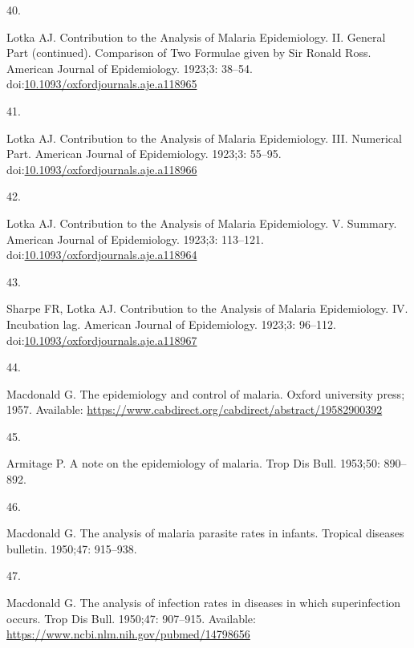 \documentclass[
]{book}
\newlength{\cslhangindent}
\newlength{\csllabelwidth}
\newlength{\cslentryspacingunit} %
\newenvironment{CSLReferences}[2] %
 {%
  \setlength{\parindent}{0pt}
  \ifodd #1
  \let\oldpar\par
  \def\par{\hangindent=\cslhangindent\oldpar}
  \fi
  \setlength{\parskip}{#2\cslentryspacingunit}
 }%
 {}
\newcommand{\CSLLeftMargin}[1]{\parbox[t]{\csllabelwidth}{#1}}
\newcommand{\CSLRightInline}[1]{\parbox[t]{\linewidth - \csllabelwidth}{#1}\break}
\begin{document}
\begin{CSLReferences}{0}{0}
\leavevmode{}%
\CSLLeftMargin{40. }%
\CSLRightInline{Lotka AJ. Contribution to the {Analysis} of {Malaria} {Epidemiology}. {II}. {General} {Part} (continued). {Comparison} of {Two} {Formulae} given by {Sir} {Ronald} {Ross}. American Journal of Epidemiology. 1923;3: 38--54. doi:\href{https://doi.org/10.1093/oxfordjournals.aje.a118965}{10.1093/oxfordjournals.aje.a118965}}

\leavevmode{}%
\CSLLeftMargin{41. }%
\CSLRightInline{Lotka AJ. Contribution to the {Analysis} of {Malaria} {Epidemiology}. {III}. {Numerical} {Part}. American Journal of Epidemiology. 1923;3: 55--95. doi:\href{https://doi.org/10.1093/oxfordjournals.aje.a118966}{10.1093/oxfordjournals.aje.a118966}}

\leavevmode{}%
\CSLLeftMargin{42. }%
\CSLRightInline{Lotka AJ. Contribution to the {Analysis} of {Malaria} {Epidemiology}. {V}. {Summary}. American Journal of Epidemiology. 1923;3: 113--121. doi:\href{https://doi.org/10.1093/oxfordjournals.aje.a118964}{10.1093/oxfordjournals.aje.a118964}}

\leavevmode{}%
\CSLLeftMargin{43. }%
\CSLRightInline{Sharpe FR, Lotka AJ. Contribution to the {Analysis} of {Malaria} {Epidemiology}. {IV}. {Incubation} lag. American Journal of Epidemiology. 1923;3: 96--112. doi:\href{https://doi.org/10.1093/oxfordjournals.aje.a118967}{10.1093/oxfordjournals.aje.a118967}}

\leavevmode{}%
\CSLLeftMargin{44. }%
\CSLRightInline{Macdonald G. The epidemiology and control of malaria. Oxford university press; 1957. Available: \url{https://www.cabdirect.org/cabdirect/abstract/19582900392}}

\leavevmode{}%
\CSLLeftMargin{45. }%
\CSLRightInline{Armitage P. A note on the epidemiology of malaria. Trop Dis Bull. 1953;50: 890--892. }

\leavevmode{}%
\CSLLeftMargin{46. }%
\CSLRightInline{Macdonald G. The analysis of malaria parasite rates in infants. Tropical diseases bulletin. 1950;47: 915--938. }

\leavevmode{}%
\CSLLeftMargin{47. }%
\CSLRightInline{Macdonald G. The analysis of infection rates in diseases in which superinfection occurs. Trop Dis Bull. 1950;47: 907--915. Available: \url{https://www.ncbi.nlm.nih.gov/pubmed/14798656}}


\end{CSLReferences}
\end{document}
